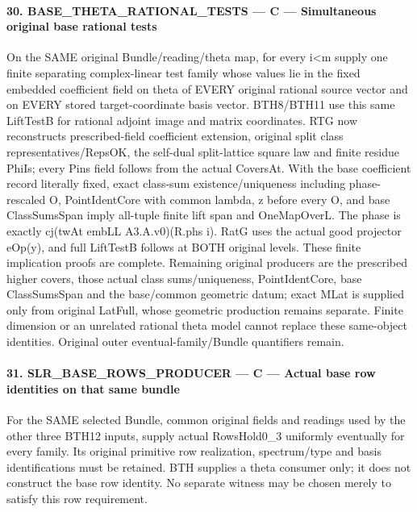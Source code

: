 \documentclass[11pt,a4paper]{article}
\numberwithin{equation}{section}
\theoremstyle{remark}\newtheorem{remark}[theorem]{Remark}
\begin{document}
\paragraph{30. BASE\_\allowbreak{}THETA\_\allowbreak{}RATIONAL\_\allowbreak{}TESTS — C — Simultaneous original base rational tests}

On the SAME original Bundle/\allowbreak{}reading/\allowbreak{}theta map, for every i<m supply one finite separating complex-linear test family whose values lie in the fixed embedded coefficient field on theta of EVERY original rational source vector and on EVERY stored target-coordinate basis vector. BTH8/\allowbreak{}BTH11 use this same LiftTestB for rational adjoint image and matrix coordinates. RTG now reconstructs prescribed-field coefficient extension, original split class representatives/\allowbreak{}RepsOK, the self-dual split-lattice square law and finite residue PhiIs; every Pins field follows from the actual CoversAt. With the base coefficient record literally fixed, exact class-sum existence/\allowbreak{}uniqueness including phase-rescaled O, PointIdentCore with common lambda,\allowbreak{} z before every O, and base ClassSumsSpan imply all-tuple finite lift span and OneMapOverL. The phase is exactly cj(twAt embLL A3.A.v0)(R.phs i). RatG uses the actual good projector eOp(y), and full LiftTestB follows at BOTH original levels. These finite implication proofs are complete. Remaining original producers are the prescribed higher covers, those actual class sums/\allowbreak{}uniqueness, PointIdentCore, base ClassSumsSpan and the base/\allowbreak{}common geometric datum; exact MLat is supplied only from original LatFull, whose geometric production remains separate. Finite dimension or an unrelated rational theta model cannot replace these same-object identities. Original outer eventual-family/\allowbreak{}Bundle quantifiers remain.


\paragraph{31. SLR\_\allowbreak{}BASE\_\allowbreak{}ROWS\_\allowbreak{}PRODUCER — C — Actual base row identities on that same bundle}

For the SAME selected Bundle, common original fields and readings used by the other three BTH12 inputs, supply actual RowsHold0\_\allowbreak{}3 uniformly eventually for every family. Its original primitive row realization, spectrum/\allowbreak{}type and basis identifications must be retained. BTH supplies a theta consumer only; it does not construct the base row identity. No separate witness may be chosen merely to satisfy this row requirement.
\end{document}
